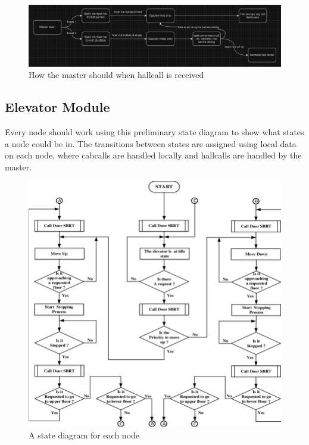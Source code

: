 \begin{figure}[H]
    \centering
    \includegraphics[width=\textwidth]{Latex/Images/Master_todo.png}
    \caption{How the master should when hallcall is received}
    \label{fig:master_todo}
\end{figure}

\subsection{Elevator Module}
Every node should work using this preliminary state diagram to show what states a node could be in. The transitions between states are assigned using local data on each node, where cabcalls are handled locally and hallcalls are handled by the master. 

\begin{figure}[H]
    \centering
    \includegraphics[width=\textwidth]{Latex/Images/418651894_696195342724008_4289962557826126166_n.png}
    \caption{A state diagram for each node}
    \label{fig:fsm_node}
\end{figure}

